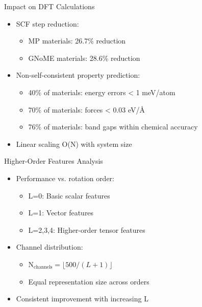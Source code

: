 \begin{frame}{Impact on DFT Calculations}
    \begin{itemize}
        \item SCF step reduction:
        \begin{itemize}
            \item MP materials: 26.7\% reduction
            \item GNoME materials: 28.6\% reduction
        \end{itemize}
        \item Non-self-consistent property prediction:
        \begin{itemize}
            \item 40\% of materials: energy errors < 1 meV/atom
            \item 70\% of materials: forces < 0.03 eV/Å
            \item 76\% of materials: band gaps within chemical accuracy
        \end{itemize}
        \item Linear scaling O(N) with system size
    \end{itemize}
\end{frame}

\begin{frame}{Higher-Order Features Analysis}
    \begin{itemize}
        \item Performance vs. rotation order:
        \begin{itemize}
            \item L=0: Basic scalar features
            \item L=1: Vector features
            \item L=2,3,4: Higher-order tensor features
        \end{itemize}
        \item Channel distribution:
        \begin{itemize}
            \item N$_{\text{channels}} = \lfloor 500/(L+1) \rfloor$
            \item Equal representation size across orders
        \end{itemize}
        \item Consistent improvement with increasing L
    \end{itemize}
\end{frame}

